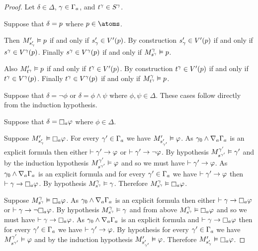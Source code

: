 \begin{proof}
Let $\delta \in \Delta$, $\gamma \in \Gamma_\agentA$, and $\kStateT[\gamma] \in \kStates[\gamma]$.

Suppose that $\delta = \atomP$ where $\atomP \in \atoms$.

Then $\kPModelP{\kStateSP_\gamma} \entails \atomP$ if and only if $\kStateSP_\gamma \in \kValuationP(\atomP)$.
By construction $\kStateSP_\gamma \in \kValuationP(\atomP)$ if and only if $\kStateS[\gamma] \in \kValuation[\gamma](\atomP)$.
Finally $\kStateS[\gamma] \in \kValuation[\gamma](\atomP)$ if and only if $\kPModel[\gamma]{\kStateS[\gamma]} \entails \atomP$.

Also $\kPModelP{\kStateT[\gamma]} \entails \atomP$ if and only if $\kStateT[\gamma] \in \kValuationP(\atomP)$.
By construction $\kStateT[\gamma] \in \kValuationP(\atomP)$ if and only if $\kStateT[\gamma] \in \kValuation[\gamma](\atomP)$.
Finally $\kStateT[\gamma] \in \kValuation[\gamma](\atomP)$ if and only if $\kPModel[\gamma]{\kStateT[\gamma]} \entails \atomP$.

Suppose that $\delta = \lnot \phi$ or $\delta = \phi \land \psi$ where $\phi, \psi \in \Delta$.
These cases follow directly from the induction hypothesis.

Suppose that $\delta = \necessaryA \phi$ where $\phi \in \Delta$.

Suppose $\kPModelP{\kStateSP_\gamma} \entails \necessaryA \phi$.
For every $\gamma' \in \Gamma_\agentA$ we have $\kPModelP{\kStateSP_{\gamma'}} \entails \phi$.
As $\gamma_0 \land \coversA \Gamma_\agentA$ is an explicit formula then either $\proves \gamma' \implies \phi$ or $\proves \gamma' \implies \lnot \phi$.
By hypothesis $\kPModel[\gamma']{\kStateS[\gamma']} \entails \gamma'$ and by the induction hypothesis $\kPModel[\gamma']{\kStateS[\gamma']} \entails \phi$ and so we must have $\proves \gamma' \implies \phi$.
As $\gamma_0 \land \coversA \Gamma_\agentA$ is an explicit formula and for every $\gamma' \in \Gamma_\agentA$ we have $\proves \gamma' \implies \phi$ then $\proves \gamma \implies \necessaryA \phi$.
By hypothesis $\kPModel[\gamma]{\kStateS[\gamma]} \entails \gamma$.
Therefore $\kPModel[\gamma]{\kStateS[\gamma]} \entails \necessaryA \phi$.

Suppose $\kPModel[\gamma]{\kStateS[\gamma]} \entails \necessaryA \phi$.
As $\gamma_0 \land \coversA \Gamma_\agentA$ is an explicit formula then either $\proves \gamma \implies \necessaryA \phi$ or $\proves \gamma \implies \lnot \necessaryA \phi$.
By hypothesis $\kPModel[\gamma]{\kStateS[\gamma]} \entails \gamma$ and from above $\kPModel[\gamma]{\kStateS[\gamma]} \entails \necessaryA \phi$ and so we must have $\proves \gamma \implies \necessaryA \phi$.
As $\gamma_0 \land \coversA \Gamma_\agentA$ is an explicit formula and $\proves \gamma \implies \necessaryA \phi$ then for every $\gamma' \in \Gamma_\agentA$ we have $\proves \gamma' \implies \phi$.
By hypothesis for every $\gamma' \in \Gamma_\agentA$ we have $\kPModel[\gamma']{\kStateS[\gamma']} \entails \phi$ and by the induction hypothesis $\kPModelP{\kStateSP_{\gamma'}} \entails \phi$.
Therefore $\kPModelP{\kStateSP_\gamma} \entails \necessaryA \phi$.


\end{proof}
